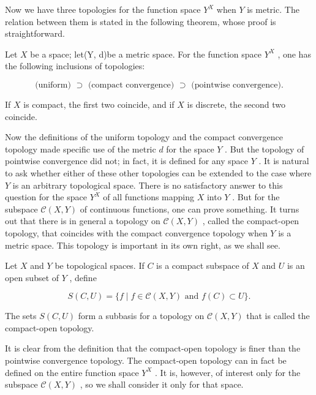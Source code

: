 Now we have three topologies for the function space \({Y}^{X}\) when \(Y\) is metric. The relation between them is stated in the following theorem, whose proof is straightforward.

\begin{theorem} Let \(X\) be a space; let(Y, d)be a metric space. For the function space \({Y}^{X}\) , one has the following inclusions of topologies:
\end{theorem}

\[
\text{ (uniform) } \supset  \text{ (compact convergence) } \supset  \text{ (pointwise convergence). }
\]

If \(X\) is compact, the first two coincide, and if \(X\) is discrete, the second two coincide.

Now the definitions of the uniform topology and the compact convergence topology made specific use of the metric \(d\) for the space \(Y\) . But the topology of pointwise convergence did not; in fact, it is defined for any space \(Y\) . It is natural to ask whether either of these other topologies can be extended to the case where \(Y\) is an arbitrary topological space. There is no satisfactory answer to this question for the space \({Y}^{X}\) of all functions mapping \(X\) into \(Y\) . But for the subspace \(\mathcal{C}\left( {X,Y}\right)\) of continuous functions, one can prove something. It turns out that there is in general a topology on \(\mathcal{C}\left( {X,Y}\right)\) , called the compact-open topology, that coincides with the compact convergence topology when \(Y\) is a metric space. This topology is important in its own right, as we shall see.

\begin{definition} Let \(X\) and \(Y\) be topological spaces. If \(C\) is a compact subspace of \(X\) and \(U\) is an open subset of \(Y\) , define

\[
S\left( {C,U}\right)  = \{ f \mid  f \in  \mathcal{C}\left( {X,Y}\right) \text{ and }f\left( C\right)  \subset  U\} .
\]

The sets \(S\left( {C,U}\right)\) form a subbasis for a topology on \(\mathcal{C}\left( {X,Y}\right)\) that is called the compact-open topology.
\end{definition}

It is clear from the definition that the compact-open topology is finer than the pointwise convergence topology. The compact-open topology can in fact be defined on the entire function space \({Y}^{X}\) . It is, however, of interest only for the subspace \(\mathcal{C}\left( {X,Y}\right)\) , so we shall consider it only for that space.

